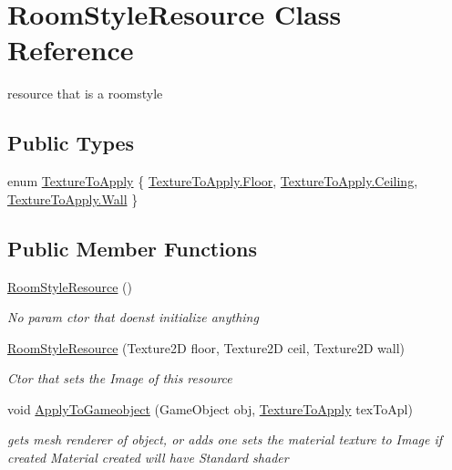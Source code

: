 \hypertarget{class_room_style_resource}{}\section{Room\+Style\+Resource Class Reference}
\label{class_room_style_resource}


resource that is a roomstyle  


\subsection*{Public Types}
\begin{DoxyCompactItemize}
\item 
enum \mbox{\hyperlink{class_room_style_resource_a877062d3830671f8376cc30340cdb45f}{Texture\+To\+Apply}} \{ \mbox{\hyperlink{class_room_style_resource_a877062d3830671f8376cc30340cdb45faf3f6d0343d56ce88ce7958170ed05cb3}{Texture\+To\+Apply.\+Floor}}, 
\mbox{\hyperlink{class_room_style_resource_a877062d3830671f8376cc30340cdb45fa3237fbc8204064c106cb9080088a17cb}{Texture\+To\+Apply.\+Ceiling}}, 
\mbox{\hyperlink{class_room_style_resource_a877062d3830671f8376cc30340cdb45fa94e8a499539d1a472f3b5dbbb85508c0}{Texture\+To\+Apply.\+Wall}}
 \}
\end{DoxyCompactItemize}
\subsection*{Public Member Functions}
\begin{DoxyCompactItemize}
\item 
\mbox{\hyperlink{class_room_style_resource_a207acd092d1aac00169f329097e836fc}{Room\+Style\+Resource}} ()
\begin{DoxyCompactList}\small\item\em No param ctor that doens\textquotesingle{}t initialize anything \end{DoxyCompactList}\item 
\mbox{\hyperlink{class_room_style_resource_aa269ae01fc600ab23b7f7ce6a742a3f5}{Room\+Style\+Resource}} (Texture2D floor, Texture2D ceil, Texture2D wall)
\begin{DoxyCompactList}\small\item\em Ctor that sets the Image of this resource \end{DoxyCompactList}\item 
void \mbox{\hyperlink{class_room_style_resource_a631919fd4d90b01b2bfad87a30a6b7b2}{Apply\+To\+Gameobject}} (Game\+Object obj, \mbox{\hyperlink{class_room_style_resource_a877062d3830671f8376cc30340cdb45f}{Texture\+To\+Apply}} tex\+To\+Apl)
\begin{DoxyCompactList}\small\item\em gets mesh renderer of object, or adds one sets the material texture to Image if created Material created will have Standard shader \end{DoxyCompactList}\end{DoxyCompactItemize}
